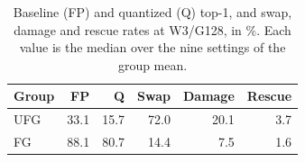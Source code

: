 \begin{table}[t]
\centering
\caption{Baseline (FP) and quantized (Q) top-1, and swap, damage and rescue rates at W3/G128, in \%. Each value is the median over the nine settings of the group mean.}
\label{tab:groups}
\setlength{\tabcolsep}{3pt}
\small
\begin{tabular}{lrrrrr}
\toprule
Group & FP & Q & Swap & Damage & Rescue \\
\midrule
UFG & 33.1 & 15.7 & 72.0 & 20.1 & 3.7 \\
FG & 88.1 & 80.7 & 14.4 & 7.5 & 1.6 \\
\bottomrule
\end{tabular}
\end{table}
